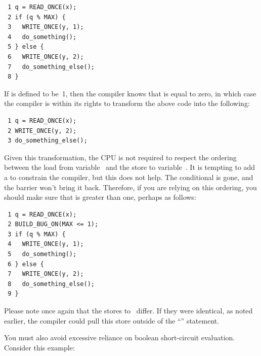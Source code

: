 \vspace{5pt}
\begin{minipage}[t]{\columnwidth}
\scriptsize
\begin{verbatim}
 1 q = READ_ONCE(x);
 2 if (q % MAX) {
 3   WRITE_ONCE(y, 1);
 4   do_something();
 5 } else {
 6   WRITE_ONCE(y, 2);
 7   do_something_else();
 8 }
\end{verbatim}
\end{minipage}
\vspace{5pt}

If  is defined to be~1, then the compiler knows that  is
equal to zero, in which case the compiler is within its rights to
transform the above code into the following:

\vspace{5pt}
\begin{minipage}[t]{\columnwidth}
\scriptsize
\begin{verbatim}
 1 q = READ_ONCE(x);
 2 WRITE_ONCE(y, 2);
 3 do_something_else();
\end{verbatim}
\end{minipage}
\vspace{5pt}

Given this transformation, the CPU is not required to respect the ordering
between the load from variable~ and the store to variable~.
It is tempting to add a  to constrain the compiler,
but this does not help.
The conditional is gone, and the barrier won't bring it back.
Therefore, if you are relying on this ordering, you should make sure
that  is greater than one, perhaps as follows:

\vspace{5pt}
\begin{minipage}[t]{\columnwidth}
\scriptsize
\begin{verbatim}
 1 q = READ_ONCE(x);
 2 BUILD_BUG_ON(MAX <= 1);
 3 if (q % MAX) {
 4   WRITE_ONCE(y, 1);
 5   do_something();
 6 } else {
 7   WRITE_ONCE(y, 2);
 8   do_something_else();
 9 }
\end{verbatim}
\end{minipage}
\vspace{5pt}

Please note once again that the stores to~ differ.
If they were identical, as noted earlier, the compiler could pull this
store outside of the ``'' statement.

You must also avoid excessive reliance on boolean short-circuit evaluation.
Consider this example:

